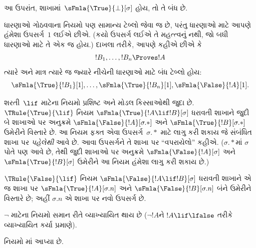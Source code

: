 આ ઉપરાંત, શાખામાં~$\sFmla{\True}{\bot}[\sigma]$
હોય, તો તે બંધ છે.

ધારણાઓ ગોઠવવાના નિયમો પણ સામાન્ય ટેબ્લો
જેવા જ છે, પરંતુ ધારણાઓ માટે આપણે હંમેશા
ઉપસર્ગ~$1$ લઈએ છીએ. (કયો ઉપસર્ગ લઈએ તે
મહત્ત્વનું નથી, જો બધી ધારણાઓ માટે તે એક જ હોય.)
દાખલા તરીકે, આપણે કહીએ છીએ કે
\[
!B_1, \dots, !B_n \Proves !A
\]
ત્યારે અને માત્ર ત્યારે જ જ્યારે નીચેની ધારણાઓ
માટે બંધ ટેબ્લો હોય:
\[
\sFmla{\True}{!B_1}[1], \dots, \sFmla{\True}{!B_n}[1],
\sFmla{\False}{!A}[1].
\]

શરતી~$\lif$ માટેના નિયમો પ્રશિષ્ટ અને મોડલ
કિસ્સાઓથી જુદા છે. $\TRule{\True}{\lif}$ નિયમ
$\sFmla{\True}{!A \lif !B}[\sigma]$ ધરાવતી શાખાને
જુદી બે શાખાઓ પર અનુક્રમે
$\sFmla{\False}{!A}[\sigma.{*}]$ અને
$\sFmla{\True}{!B}[\sigma.{*}]$ ઉમેરીને વિસ્તારે છે.
આ નિયમ ફક્ત એવા ઉપસર્ગ~$\sigma.{*}$ માટે
લાગુ કરી શકાય જે સંબંધિત શાખા પર \emph{પહેલેથી}
આવે છે. આવા ઉપસર્ગને તે શાખા પર ``વપરાયેલો''
કહીએ. ($\sigma.{*}$માં $\sigma$ પોતે પણ આવે છે,
તેથી જુદી શાખાઓ પર અનુક્રમે
$\sFmla{\False}{!A}[\sigma]$ અને
$\sFmla{\True}{!B}[\sigma]$ ઉમેરીને આ નિયમ
હંમેશા લાગુ કરી શકાય છે.)

$\TRule{\False}{\lif}$ નિયમ
$\sFmla{\False}{!A \lif !B}[\sigma]$ ધરાવતી શાખાને
એ જ શાખા પર $\sFmla{\True}{!A}[\sigma.n]$
અને $\sFmla{\False}{!B}[\sigma.n]$ બંને ઉમેરીને
વિસ્તારે છે; અહીં $\sigma.n$ એ શાખા પર નવો
ઉપસર્ગ છે.

$\lnot$ માટેના નિયમો સમાન રીતે વ્યાખ્યાયિત થાય છે
($\lnot !A$ને $!A \lif \lfalse$ તરીકે વ્યાખ્યાયિત
કર્યા પ્રમાણે).

નિયમો માં આપ્યા છે.

